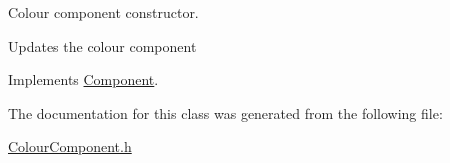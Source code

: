 Colour component constructor. 

Updates the colour component 

Implements \mbox{\hyperlink{class_component}{Component}}.



The documentation for this class was generated from the following file\+:\begin{DoxyCompactItemize}
\item 
\mbox{\hyperlink{_colour_component_8h}{Colour\+Component.\+h}}\end{DoxyCompactItemize}
